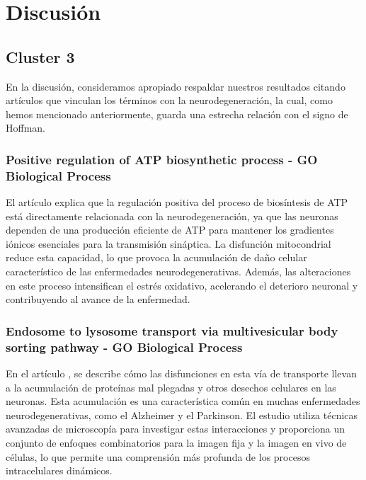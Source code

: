 \section{Discusión}

\subsection{Cluster 3}

En la discusión, consideramos apropiado respaldar nuestros resultados citando artículos que vinculan los términos con la neurodegeneración, la cual, como hemos mencionado anteriormente, guarda una estrecha relación con el signo de Hoffman.

\subsubsection{Positive regulation of ATP biosynthetic process - GO Biological Process}
El artículo \cite{Bonvento2017} explica que la regulación positiva del proceso de biosíntesis de ATP está directamente relacionada con la neurodegeneración, ya que las neuronas dependen de una producción eficiente de ATP para mantener los gradientes iónicos esenciales para la transmisión sináptica. La disfunción mitocondrial reduce esta capacidad, lo que provoca la acumulación de daño celular característico de las enfermedades neurodegenerativas. Además, las alteraciones en este proceso intensifican el estrés oxidativo, acelerando el deterioro neuronal y contribuyendo al avance de la enfermedad. 

\subsubsection{Endosome to lysosome transport via multivesicular body sorting pathway - GO Biological Process}
En el artículo \cite{Mulligan2023}, se describe cómo las disfunciones en esta vía de transporte llevan a la acumulación de proteínas mal plegadas y otros desechos celulares en las neuronas. Esta acumulación es una característica común en muchas enfermedades neurodegenerativas, como el Alzheimer y el Parkinson. El estudio utiliza técnicas avanzadas de microscopía para investigar estas interacciones y proporciona un conjunto de enfoques combinatorios para la imagen fija y la imagen en vivo de células, lo que permite una comprensión más profunda de los procesos intracelulares dinámicos.


